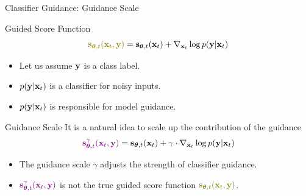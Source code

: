 \documentclass{beamer}
\renewcommand{\eqpause}{}
\begin{document}
\begin{frame}{Classifier Guidance: Guidance Scale}
	\begin{block}{Guided Score Function}
		\vspace{-0.3cm}
		\[
			{\color{olive}\bs_{\btheta, t}(\bx_t, \by)} = \bs_{\btheta, t}(\bx_t) + \nabla_{\bx_t} \log p(\by | \bx_t)
		\]
		\vspace{-0.5cm}
	\end{block}
	\eqpause
	\begin{itemize}
		\item Let us assume $\mathbf{y}$ is a class label.
		\item $p(\mathbf{y} | \mathbf{x}_t)$ is a classifier for noisy inputs.
		\item $p(\mathbf{y} | \mathbf{x}_t)$ is responsible for model guidance.
	\end{itemize}
	\eqpause
	\begin{block}{Guidance Scale}
		It is a natural idea to scale up the contribution of the guidance
		\[
			{\color{violet}\mathbf{s}^{\gamma}_{\boldsymbol{\theta}, t}(\mathbf{x}_t, \mathbf{y})} = \mathbf{s}_{\boldsymbol{\theta}, t}(\mathbf{x}_t) + {\color{teal}\gamma} \cdot \nabla_{\mathbf{x}_t} \log p(\mathbf{y} | \mathbf{x}_t)
		\]
		\eqpause
		\vspace{-0.5cm}
		\begin{itemize}
			\item The {\color{teal}guidance scale $\gamma$} adjusts the strength of classifier guidance.
			\item ${\color{violet}\mathbf{s}^{\gamma}_{\boldsymbol{\theta}, t}(\mathbf{x}_t, \mathbf{y})}$ is not the true guided score function ${\color{olive}\bs_{\btheta, t}(\bx_t, \by)}$.
		\end{itemize}
	\end{block}
\end{frame}
\end{document}
